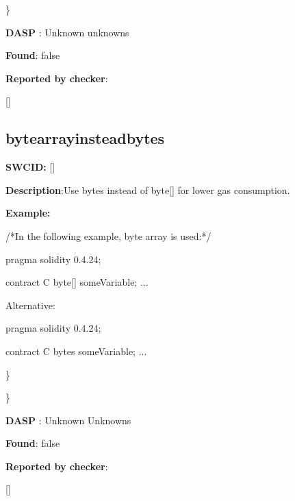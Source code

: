 \documentclass{article}
\begin{document}
\} 

\textbf{DASP} : Unknown unknowns

\textbf{Found}: false

\textbf{Reported by checker}: 
\begin{ffcode} 

[]
\end{ffcode} 
\subsection{byte{\textunderscore}array{\textunderscore}instead{\textunderscore}bytes} 
\textbf{SWC{\textunderscore}ID:} []

\textbf{Description}:Use bytes instead of byte[] for lower gas consumption.


\textbf{Example:} 
\begin{ffcode} 

/*In the following example, byte array is used:*/ 

pragma solidity 0.4.24;

contract C {
    byte[] someVariable;
    ...
}

Alternative:

pragma solidity 0.4.24;

contract C {
    bytes someVariable;
    ...
}

\end{ffcode} 
\} 

\} 

\textbf{DASP} : Unknown Unknowns

\textbf{Found}: false

\textbf{Reported by checker}: 
\begin{ffcode} 

[]
\end{ffcode} 
\end{document}
